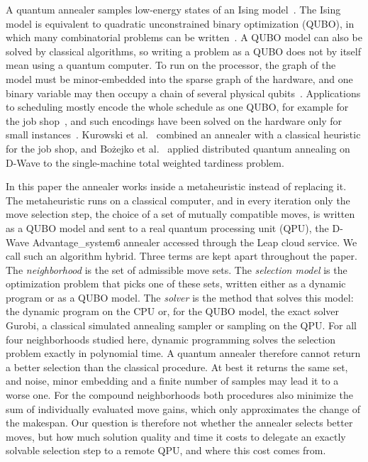 \documentclass[10pt,twoside,twocolumn,a4paper]{article}
\newif\ifrevmarks \revmarksfalse
\newenvironment{revblock}{\ifrevmarks\color{red}\fi}{}
\begin{document}
\begin{revblock}
A quantum annealer samples low-energy states of an Ising model~\cite{Kadowaki1998,Johnson2011}. The Ising model is equivalent to quadratic unconstrained binary optimization (QUBO), in which many combinatorial problems can be written~\cite{lucas2014ising,Glover2019}. A QUBO model can also be solved by classical algorithms, so writing a problem as a QUBO does not by itself mean using a quantum computer. To run on the processor, the graph of the model must be minor-embedded into the sparse graph of the hardware, and one binary variable may then occupy a chain of several physical qubits~\cite{Cai2014}. Applications to scheduling mostly encode the whole schedule as one QUBO, for example for the job shop~\cite{Venturelli2015}, and such encodings have been solved on the hardware only for small instances~\cite{dwave_handbook}. Kurowski et al.~\cite{Kurowski2020} combined an annealer with a classical heuristic for the job shop, and Bożejko et al.~\cite{Bozejko2022ICCS} applied distributed quantum annealing on D-Wave to the single-machine total weighted tardiness problem.

In this paper the annealer works inside a metaheuristic instead of replacing it. The metaheuristic runs on a classical computer, and in every iteration only the move selection step, the choice of a set of mutually compatible moves, is written as a QUBO model and sent to a real quantum processing unit (QPU), the D-Wave Advantage\_system6 annealer accessed through the Leap cloud service. We call such an algorithm hybrid. Three terms are kept apart throughout the paper. The \emph{neighborhood} is the set of admissible move sets. The \emph{selection model} is the optimization problem that picks one of these sets, written either as a dynamic program or as a QUBO model. The \emph{solver} is the method that solves this model: the dynamic program on the CPU or, for the QUBO model, the exact solver Gurobi, a classical simulated annealing sampler or sampling on the QPU. For all four neighborhoods studied here, dynamic programming solves the selection problem exactly in polynomial time. A quantum annealer therefore cannot return a better selection than the classical procedure. At best it returns the same set, and noise, minor embedding and a finite number of samples may lead it to a worse one. For the compound neighborhoods both procedures also minimize the sum of individually evaluated move gains, which only approximates the change of the makespan. Our question is therefore not whether the annealer selects better moves, but how much solution quality and time it costs to delegate an exactly solvable selection step to a remote QPU, and where this cost comes from.


\end{revblock}
\end{document}
